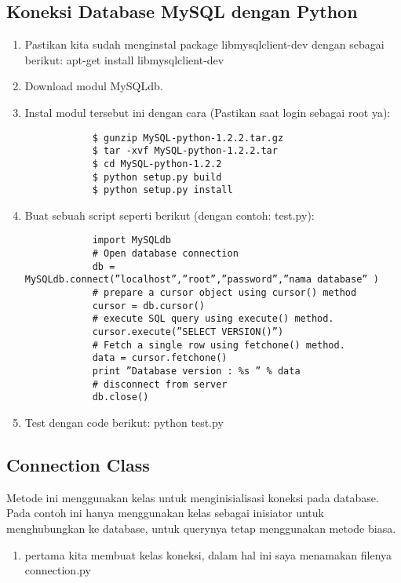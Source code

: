 \begin{enumerate}
\subsection {Koneksi Database MySQL dengan Python}
	\begin{enumerate}
		\item  Pastikan kita sudah menginstal package libmysqlclient-dev dengan sebagai berikut: 
		       apt-get install libmysqlclient-dev 
		\item  Download modul MySQLdb.
		\item  Instal modul tersebut ini dengan cara (Pastikan saat login sebagai root ya):
			\begin{verbatim}
			$ gunzip MySQL-python-1.2.2.tar.gz 
			$ tar -xvf MySQL-python-1.2.2.tar 
			$ cd MySQL-python-1.2.2 
			$ python setup.py build 
			$ python setup.py install 
			\end{verbatim}
		\item  Buat sebuah script seperti berikut (dengan contoh: test.py):
			\begin{verbatim}
			import MySQLdb 
			# Open database connection 
			db = MySQLdb.connect(”localhost”,”root”,”password”,”nama database” ) 
			# prepare a cursor object using cursor() method 
			cursor = db.cursor() 
			# execute SQL query using execute() method. 
			cursor.execute(”SELECT VERSION()”) 
			# Fetch a single row using fetchone() method. 
			data = cursor.fetchone() 
			print ”Database version : %s ” % data 
			# disconnect from server 
			db.close()
			\end{verbatim}
		\item Test dengan code berikut:
		      python test.py 
	\end{enumerate}
\subsection {Connection Class}
Metode ini menggunakan kelas untuk menginisialisasi koneksi pada database. 
Pada contoh ini hanya menggunakan kelas sebagai inisiator untuk menghubungkan ke database, 
untuk querynya tetap menggunakan metode biasa.
\begin{enumerate}
\item pertama kita membuat kelas koneksi, dalam hal ini saya menamakan filenya connection.py


\end{enumerate}
\end{enumerate}
